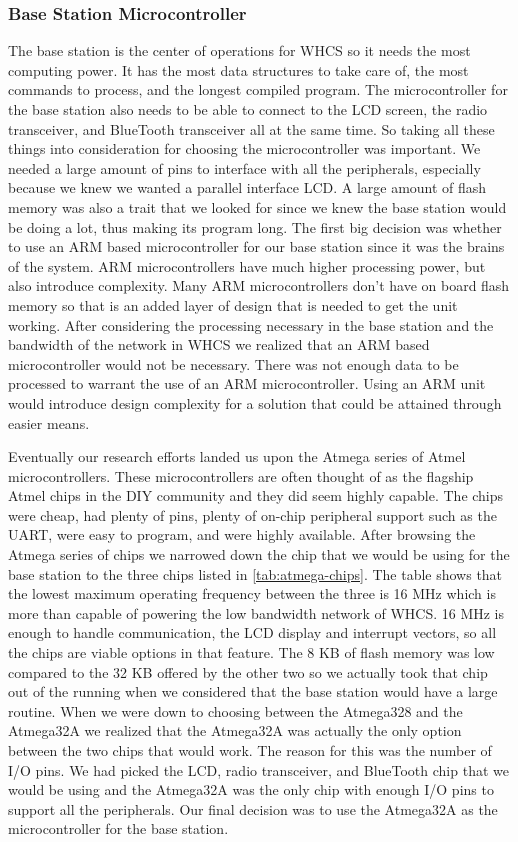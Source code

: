 \subsubsection{Base Station Microcontroller}
The base station is the center of operations for WHCS so it needs the most
computing power. It has the most data structures to take care of, the most
commands to process, and the longest compiled program. The microcontroller for
the base station also needs to be able to connect to the LCD screen, the radio
transceiver, and BlueTooth transceiver all at the same time. So taking all
these things into consideration for choosing the microcontroller was important.
We needed a large amount of pins to interface with all the peripherals,
especially because we knew we wanted a parallel interface LCD. A large amount
of flash memory was also a trait that we looked for since we knew the base
station would be doing a lot, thus making its program long. The first big
decision was whether to use an ARM based microcontroller for our base station
since it was the brains of the system. ARM microcontrollers have much higher
processing power, but also introduce complexity. Many ARM microcontrollers
don{}'t have on board flash memory so that is an added layer of design that is
needed to get the unit working. After considering the processing necessary in
the base station and the bandwidth of the network in WHCS we realized that an
ARM based microcontroller would not be necessary. There was not enough data to
be processed to warrant the use of an ARM microcontroller. Using an ARM unit
would introduce design complexity for a solution that could be attained through
easier means.

Eventually our research efforts landed us upon the Atmega series of Atmel
microcontrollers. These microcontrollers are often thought of as the flagship
Atmel chips in the DIY community and they did seem highly capable. The chips
were cheap, had plenty of pins, plenty of on{}-chip peripheral support such as
the UART, were easy to program, and were highly available. After browsing the
Atmega series of chips we narrowed down the chip that we would be using for the
base station to the three chips listed in \autoref{tab:atmega-chips}. The table
shows that the lowest maximum operating frequency between the three is 16 MHz
which is more than capable of powering the low bandwidth network of WHCS. 16
MHz is enough to handle communication, the LCD display and interrupt vectors,
so all the chips are viable options in that feature. The 8 KB of flash memory
was low compared to the 32 KB offered by the other two so we actually took that
chip out of the running when we considered that the base station would have a
large routine. When we were down to choosing between the Atmega328 and the
Atmega32A we realized that the Atmega32A was actually the only option between
the two chips that would work. The reason for this was the number of I/O pins.
We had picked the LCD, radio transceiver, and BlueTooth chip that we would be
using and the Atmega32A was the only chip with enough I/O pins to support all
the peripherals. Our final decision was to use the Atmega32A as the
microcontroller for the base station.

